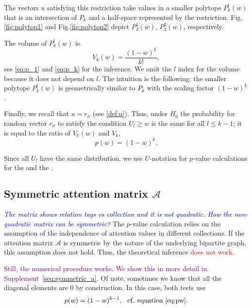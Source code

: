 \documentclass{llncs}
\begin{document}
The vectors $u$ satisfying this restriction take values in a smaller polytope $P^{l}_{k}(w)$ that is an intersection of $P_{k}$ and a half-space represented by the restriction.
Fig.\ref{fig:polytop1} and Fig.\ref{fig:polytop2} depict $P^{1}_{3}(w)$, $P^{2}_{3}(w)$, respectively. 

The volume of $P^{l}_{k}(w)$ is 
\begin{equation}
V_{k}(w) = \frac{(1-w)^k}{k!},
\end{equation}
see \eqref{eq:p_1} and \eqref{eq:p_k} for the inference. We omit the $l$ index for the volume because it does not depend on $l$. The intuition is the following: the smaller polytope $P^{l}_{k}(w)$ is geometrically similar to $P_{k}$ with the scaling factor $(1-w)^k$. 

Finally, we recall that $u = r_{\sigma}$ (see \eqref{def:u}). Thus, under $H_0$ the probability for random vector $r_{\sigma}$ to satisfy the condition $U_{l} \ge w$ is the same for all $l\leq k-1$; it is equal to the ratio of $V_{k}(w)$ and $V_k$,
\begin{equation}
\label{eq:pw}
    p(w) = (1-w)^k.
\end{equation}



Since all $U_l$ have the same distribution, we use $U$-notation for $p$-value calculations for the  and the .


\subsection{Symmetric attention matrix $\mathcal{A}$}
\textcolor{blue}{\textit{The matrix shows relation tags vs collection and it is not quadratic. How the non-quadratic matrix can be symmetric?}}
The $p$-value calculation relies on the assumption of the independence of attention values in different collections. If the attention matrix $\mathcal{A}$ is symmetric by the nature of the underlying bipartite graph, this assumption does not hold. Thus, the theoretical inference \textcolor{red}{does not work}.

\textcolor{purple}{Still, the numerical procedure works. We show this in more detail in Supplement~\ref{seq:symmetric_a}}. Of note, sometimes we know that all the diagonal elements are $0$ by construction. In this case, both tests use 
\[
p(w) = (1-w)^{k-1}, ~~\text{cf. equation \eqref{eq:pw}.}
\]

\end{document}
